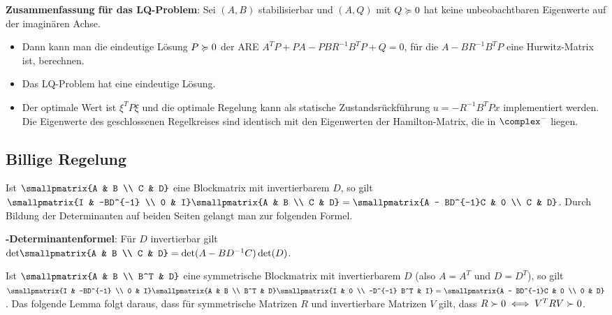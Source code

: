 \textbf{Zusammenfassung für das LQ-Problem}:
Sei $(A, B)$ stabilisierbar und $(A, Q)$ mit $Q \succcurlyeq 0$ hat keine
unbeobachtbaren Eigenwerte auf der imaginären Achse.
\begin{itemize}
    \item
    Dann kann man die eindeutige Lösung $P \succcurlyeq 0$ der ARE
    $A^T P + PA - PBR^{-1} B^T P + Q = 0$,
    für die $A - BR^{-1} B^T P$ eine Hurwitz-Matrix ist, berechnen.

    \item
    Das LQ-Problem hat eine eindeutige Lösung.

    \item
    Der optimale Wert ist $\xi^T P \xi$ und die optimale Regelung kann als statische
    Zustandsrückführung $u = -R^{-1} B^T Px$ implementiert werden.
    Die Eigenwerte des geschlossenen Regelkreises sind identisch mit den Eigenwerten
    der Hamilton-Matrix, die in $\complex^-$ liegen.
\end{itemize}

\pagebreak

\subsection{%
    Billige Regelung%
}

Ist $\smallpmatrix{A & B \\ C & D}$ eine Blockmatrix mit invertierbarem $D$,
so gilt
$\smallpmatrix{I & -BD^{-1} \\ 0 & I} \smallpmatrix{A & B \\ C & D} =
\smallpmatrix{A - BD^{-1}C & 0 \\ C & D}$.
Durch Bildung der Determinanten auf beiden Seiten gelangt man zur folgenden Formel.

\textbf{-Determinantenformel}:
Für $D$ invertierbar gilt\\
$\det\!\smallpmatrix{A & B \\ C & D} = \det(A - BD^{-1}C) \det(D)$.

Ist $\smallpmatrix{A & B \\ B^T & D}$ eine symmetrische Blockmatrix mit invertierbarem $D$
(also $A = A^T$ und $D = D^T$), so gilt
$\smallpmatrix{I & -BD^{-1} \\ 0 & I} \smallpmatrix{A & B \\ B^T & D}
\smallpmatrix{I & 0 \\ -D^{-1} B^T & I} = \smallpmatrix{A - BD^{-1}C & 0 \\ 0 & D}$.
Das folgende Lemma folgt daraus, dass für symmetrische Matrizen $R$ und
invertierbare Matrizen $V$ gilt, dass $R \succ 0 \iff V^T RV \succ 0$.

